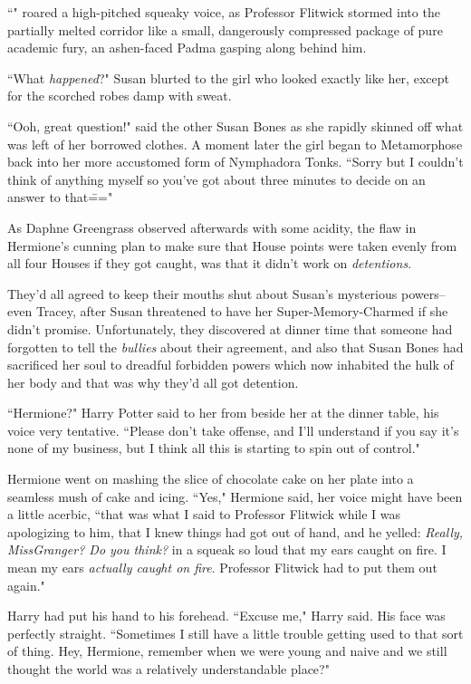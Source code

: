 ``" roared a high-pitched squeaky voice, as Professor Flitwick stormed into the partially melted corridor like a small, dangerously compressed package of pure academic fury, an ashen-faced Padma gasping along behind him.

\later

``What \emph{happened}?" Susan blurted to the girl who looked exactly like her, except for the scorched robes damp with sweat.

``Ooh, great question!" said the other Susan Bones as she rapidly skinned off what was left of her borrowed clothes. A moment later the girl began to Metamorphose back into her more accustomed form of Nymphadora Tonks. ``Sorry but I couldn't think of anything myself so you've got about three minutes to decide on an answer to that\==="

\later

As Daphne Greengrass observed afterwards with some acidity, the flaw in Hermione's cunning plan to make sure that House points were taken evenly from all four Houses if they got caught, was that it didn't work on \emph{detentions}.

They'd all agreed to keep their mouths shut about Susan's mysterious powers\---even Tracey, after Susan threatened to have her Super-Memory-Charmed if she didn't promise. Unfortunately, they discovered at dinner time that someone had forgotten to tell the \emph{bullies} about their agreement, and also that Susan Bones had sacrificed her soul to dreadful forbidden powers which now inhabited the hulk of her body and that was why they'd all got detention.

``Hermione?" Harry Potter said to her from beside her at the dinner table, his voice very tentative. ``Please don't take offense, and I'll understand if you say it's none of my business, but I think all this is starting to spin out of control."

Hermione went on mashing the slice of chocolate cake on her plate into a seamless mush of cake and icing. ``Yes," Hermione said, her voice might have been a little acerbic, ``that was what I said to Professor Flitwick while I was apologizing to him, that I knew things had got out of hand, and he yelled: \emph{Really, Miss\?Granger? Do you think?} in a squeak so loud that my ears caught on fire. I mean my ears \emph{actually caught on fire}. Professor Flitwick had to put them out again."

Harry had put his hand to his forehead. ``Excuse me," Harry said. His face was perfectly straight. ``Sometimes I still have a little trouble getting used to that sort of thing. Hey, Hermione, remember when we were young and naive and we still thought the world was a relatively understandable place?"

